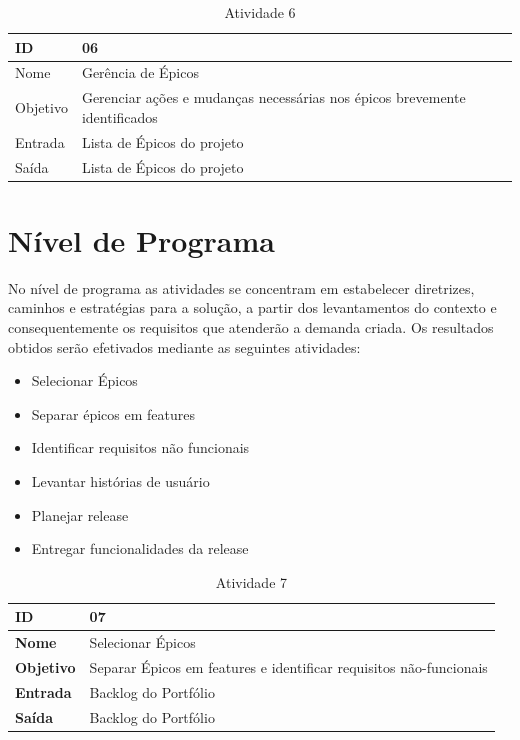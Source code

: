 \begin{table}[h]
	\centering
	\caption{Atividade 6}
	\label{my-label}
	\begin{tabular}{|l|l|}
		\hline
		ID       & 06                                                                         \\ \hline
		Nome     & Gerência de Épicos                                                         \\ \hline
		Objetivo & Gerenciar ações e mudanças necessárias nos épicos brevemente identificados \\ \hline
		Entrada  & Lista de Épicos do projeto                                                 \\ \hline
		Saída    & Lista de Épicos do projeto                                                 \\ \hline
	\end{tabular}
\end{table}

\section{Nível de Programa}
No nível de programa as atividades se concentram em estabelecer diretrizes, caminhos e estratégias para a solução,
a partir dos levantamentos do contexto e consequentemente os requisitos que atenderão a demanda criada. Os resultados
obtidos serão efetivados mediante as seguintes atividades:

\begin{itemize}
	\item Selecionar Épicos
	\item Separar épicos em features
	\item Identificar requisitos não funcionais
	\item Levantar histórias de usuário
	\item Planejar release
	\item Entregar funcionalidades da release
\end{itemize}

\begin{table}[h]
	\centering
	\caption{Atividade 7}
	\label{my-label}
	\begin{tabular}{|l|l|}
	\hline
	\textbf{ID}       & 07                                                                 \\ \hline
	\textbf{Nome}     & Selecionar Épicos                                                  \\ \hline
	\textbf{Objetivo} & Separar Épicos em features e identificar requisitos não-funcionais \\ \hline
	\textbf{Entrada}  & Backlog do Portfólio                                               \\ \hline
	\textbf{Saída}    & Backlog do Portfólio                                               \\ \hline
	\end{tabular}
\end{table}

